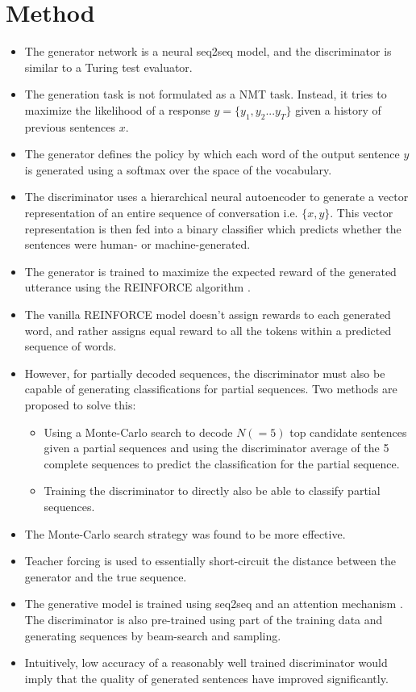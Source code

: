 \documentclass[12pt]{article}
\begin{document}
\section{Method}
  \begin{itemize}
    \item The generator network is a neural seq2seq model, and the discriminator is similar to a Turing test evaluator.
    \item The generation task is not formulated as a NMT task. Instead, it tries to maximize the likelihood of a response $y = \{y_1, y_2 ... y_T\}$ given a history of previous sentences $x$.
    \item The generator defines the policy by which each word of the output sentence $y$ is generated using a softmax over the space of the vocabulary.
    \item The discriminator uses a hierarchical neural autoencoder to generate a vector representation of an entire sequence of conversation i.e. $\{x, y\}$. This vector representation is then fed into a binary classifier which predicts whether the sentences were human- or machine-generated.
    \item The generator is trained to maximize the expected reward of the generated utterance using the REINFORCE algorithm \cite{williams1988use}.
    \item The vanilla REINFORCE model doesn't assign rewards to each generated word, and rather assigns equal reward to all the tokens within a predicted sequence of words.
    \item However, for partially decoded sequences, the discriminator must also be capable of generating classifications for partial sequences. Two methods are proposed to solve this:
    \begin{itemize}
      \item Using a Monte-Carlo search to decode $N ( = 5)$ top candidate sentences given a partial sequences and using the discriminator average of the 5 complete sequences to predict the classification for the partial sequence.
      \item Training the discriminator to directly also be able to classify partial sequences.
    \end{itemize}
    \item The Monte-Carlo search strategy was found to be more effective.
    \item Teacher forcing is used to essentially short-circuit the distance between the generator and the true sequence.
    \item The generative model is trained using seq2seq \cite{sutskever2014sequence} and an attention mechanism \cite{bahdanau2014neural}. The discriminator is also pre-trained using part of the training data and generating sequences by beam-search and sampling.
    \item Intuitively, low accuracy of a reasonably well trained discriminator would imply that the quality of generated sentences have improved significantly.
  \end{itemize}
\end{document}
